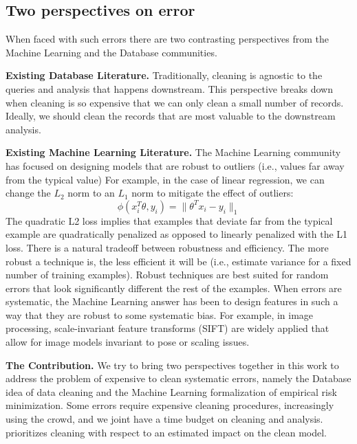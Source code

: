 \iffalse

\subsection{Two perspectives on error}
When faced with such errors there are two contrasting perspectives from the Machine Learning and the Database communities.

\vspace{0.5em}

\noindent\textbf{Existing Database Literature. } 
Traditionally, cleaning is agnostic to the queries and analysis that happens downstream. 
This perspective breaks down when cleaning is so expensive that we can only clean a small number of records.
Ideally, we should clean the records that are most valuable to the downstream analysis.

\vspace{0.5em}

\noindent\textbf{Existing  Machine Learning Literature. } The Machine Learning community has focused on
designing models that are robust to outliers (i.e., values far away from the typical value)
For example, in the case of linear regression, we can change the $L_2$ norm to an $L_1$ norm to mitigate the effect of outliers:
\[
\phi(x_{i}^T\theta,y_{i}) = \|\theta^Tx_{i} - y_i \|_1
\]
The quadratic L2 loss implies that examples that deviate far from the typical example are quadratically penalized as opposed to linearly penalized with the L1 loss.
There is a natural tradeoff between robustness and efficiency.
The more robust a technique is, the less efficient it will be (i.e., estimate variance for a fixed number of training examples).
Robust techniques are best suited for random errors that look significantly different the rest of the examples.
When errors are systematic, the Machine Learning answer has been to design features in such a way that they are robust to some systematic bias.
For example, in image processing, scale-invariant feature transforms (SIFT) are widely applied that allow for image models invariant to pose or scaling issues.

\vspace{0.5em}

\noindent\textbf{The \sys Contribution. } We try to bring two perspectives together in this work to address the problem of expensive to clean systematic errors, namely the Database idea of data cleaning and the Machine Learning formalization of empirical risk minimization.
Some errors require expensive cleaning procedures, increasingly using the crowd, and we joint have a time budget on cleaning and analysis.
\sys prioritizes cleaning with respect to an estimated impact on the clean model.



